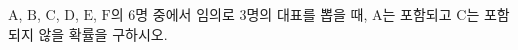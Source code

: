 $\mathrm{A}$, $\mathrm{B}$, $\mathrm{C}$, $\mathrm{D}$, $\mathrm{E}$, $\mathrm{F}$의 $6$명 중에서 임의로 $3$명의 대표를 뽑을 때, $\mathrm{A}$는 포함되고 $\mathrm{C}$는 포함되지 않을 확률을 구하시오.
